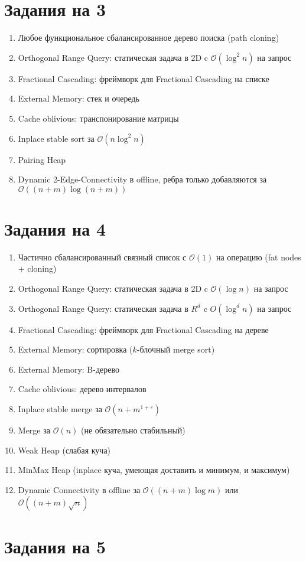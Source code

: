 \documentclass[12pt]{article}
\def\EPS{\varepsilon}
\def\O{\mathcal{O}}
\newenvironment{MyList}{
  \begin{enumerate}
  \setlength{\parskip}{-5pt}
  \setlength{\itemsep}{5pt}
}{
  \vspace*{-1em}
  \end{enumerate}
}
\newcommand\Section[1]{\vspace*{-1em}\section{#1}}
\begin{document}
\Section{Задания на 3}
\begin{MyList}
\item Любое функциональное сбалансированное дерево поиска (path cloning)
\item Orthogonal Range Query: статическая задача в 2D c $\O(\log^2 n)$ на запрос
\item Fractional Cascading: фреймворк для Fractional Cascading на списке
\item External Memory: стек и очередь
\item Cache oblivious: транспонирование матрицы
\item Inplace stable sort за $\O(n \log^2 n)$
\item Pairing Heap
\item Dynamic 2-Edge-Connectivity в offline, ребра только добавляются за $\O((n+m)\log (n+m))$
\end{MyList}
\Section{Задания на 4}
\begin{MyList}
\item Частично сбалансированный связный список с $\O(1)$ на операцию (fat nodes + cloning)
\item Orthogonal Range Query: статическая задача в 2D c $\O(\log n)$ на запрос
\item Orthogonal Range Query: статическая задача в $R^d$ c $O(\log^d n)$ на запрос
\item Fractional Cascading: фреймворк для Fractional Cascading на дереве
\item External Memory: сортировка ($k$-блочный merge sort)
\item External Memory: B-дерево
\item Cache oblivious: дерево интервалов 
\item Inplace stable merge за $\O(n + m^{1 + \EPS})$
\item Merge за $\O(n)$ (не обязательно стабильный)
\item Weak Heap (слабая куча)
\item MinMax Heap (inplace куча, умеющая доставить и минимум, и максимум)
\item Dynamic Connectivity в offline за $\O((n+m)\log m)$ или $\O((n+m)\sqrt{n})$
\end{MyList}
\Section{Задания на 5}
\end{document}
